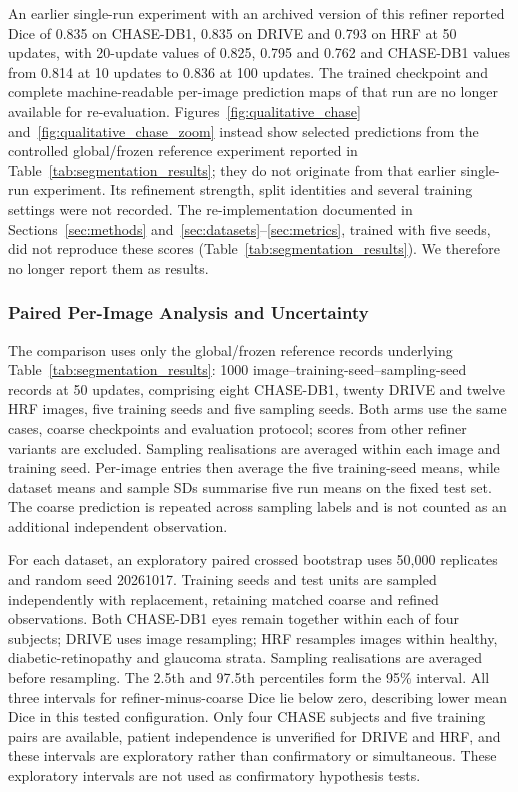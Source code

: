 \documentclass[jimaging,article,submit,pdftex,moreauthors]
  {Definitions/mdpi}
\providecommand{\linelabel}[1]{}
\newcommand{\seclabel}[1]{\linelabel{rev:sec:#1}}
\newcommand{\secend}[1]{\linelabel{rev:end:#1}}
\begin{document}
An earlier single-run experiment with an archived version of this refiner reported Dice of 0.835 on CHASE-DB1, 0.835 on DRIVE and 0.793 on HRF at 50 updates, with 20-update values of 0.825, 0.795 and 0.762 and CHASE-DB1 values from 0.814 at 10 updates to 0.836 at 100 updates. The trained checkpoint and complete machine-readable per-image prediction maps of that run are no longer available for re-evaluation. Figures~\ref{fig:qualitative_chase} and~\ref{fig:qualitative_chase_zoom} instead show selected predictions from the controlled global/frozen reference experiment reported in Table~\ref{tab:segmentation_results}; they do not originate from that earlier single-run experiment. Its refinement strength, split identities and several training settings were not recorded. The re-implementation documented in Sections~\ref{sec:methods} and~\ref{sec:datasets}--\ref{sec:metrics}, trained with five seeds, did not reproduce these scores (Table~\ref{tab:segmentation_results}). We therefore no longer report them as results.\secend{quantitative}
\subsubsection{Paired Per-Image Analysis and Uncertainty}
\label{sec:paired_per_image}
\seclabel{paired_per_image}
The comparison uses only the global/frozen reference records underlying Table~\ref{tab:segmentation_results}: 1000 image--training-seed--sampling-seed records at 50 updates, comprising eight CHASE-DB1, twenty DRIVE and twelve HRF images, five training seeds and five sampling seeds. Both arms use the same cases, coarse checkpoints and evaluation protocol; scores from other refiner variants are excluded. Sampling realisations are averaged within each image and training seed. Per-image entries then average the five training-seed means, while dataset means and sample SDs summarise five run means on the fixed test set. The coarse prediction is repeated across sampling labels and is not counted as an additional independent observation.

For each dataset, an exploratory paired crossed bootstrap uses 50,000 replicates and random seed 20261017. Training seeds and test units are sampled independently with replacement, retaining matched coarse and refined observations. Both CHASE-DB1 eyes remain together within each of four subjects; DRIVE uses image resampling; HRF resamples images within healthy, diabetic-retinopathy and glaucoma strata. Sampling realisations are averaged before resampling. The 2.5th and 97.5th percentiles form the 95\% interval. All three intervals for refiner-minus-coarse Dice lie below zero, describing lower mean Dice in this tested configuration. Only four CHASE subjects and five training pairs are available, patient independence is unverified for DRIVE and HRF, and these intervals are exploratory rather than confirmatory or simultaneous. These exploratory intervals are not used as confirmatory hypothesis tests.
\end{document}
